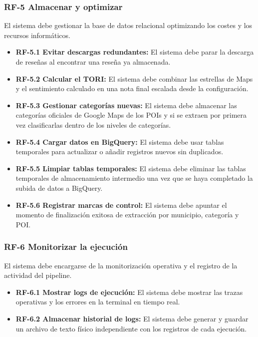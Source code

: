 \subsubsection{RF-5 Almacenar y optimizar}
El sistema debe gestionar la base de datos relacional optimizando los costes y los recursos informáticos.

\begin{itemize}
    \item \textbf{RF-5.1 Evitar descargas redundantes:} El sistema debe parar la descarga de reseñas al encontrar una reseña ya almacenada.
    \item \textbf{RF-5.2 Calcular el TORI:} El sistema debe combinar las estrellas de Maps y el sentimiento calculado en una nota final escalada desde la configuración.
    \item \textbf{RF-5.3 Gestionar categorías nuevas:} El sistema debe almacenar las categorías oficiales de Google Maps de los POIs y si se extraen por primera vez clasificarlas dentro de los niveles de categorías.
    \item \textbf{RF-5.4 Cargar datos en BigQuery:} El sistema debe usar tablas temporales para actualizar o añadir registros nuevos sin duplicados.
    \item \textbf{RF-5.5 Limpiar tablas temporales:} El sistema debe eliminar las tablas temporales de almacenamiento intermedio una vez que se haya completado la subida de datos a BigQuery.
    \item \textbf{RF-5.6 Registrar marcas de control:} El sistema debe apuntar el momento de finalización exitosa de extracción por municipio, categoría y POI.
\end{itemize}

\subsubsection{RF-6 Monitorizar la ejecución}
El sistema debe encargarse de la monitorización operativa y el registro de la actividad del pipeline.

\begin{itemize}
    \item \textbf{RF-6.1 Mostrar logs de ejecución:} El sistema debe mostrar las trazas operativas y los errores en la terminal en tiempo real.
    \item \textbf{RF-6.2 Almacenar historial de logs:} El sistema debe generar y guardar un archivo de texto físico independiente con los registros de cada ejecución.
\end{itemize}

